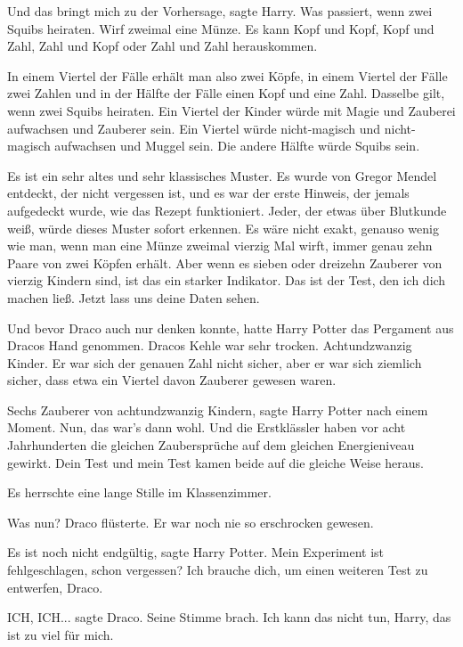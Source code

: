 \glqq Und das bringt mich zu der Vorhersage\grqq{}, sagte Harry. \glqq Was
passiert, wenn zwei Squibs heiraten. Wirf zweimal eine Münze. Es kann Kopf und
Kopf, Kopf und Zahl, Zahl und Kopf oder Zahl und Zahl herauskommen.

In einem Viertel der Fälle erhält man also zwei Köpfe, in einem Viertel der
Fälle zwei Zahlen und in der Hälfte der Fälle einen Kopf und eine Zahl. Dasselbe
gilt, wenn zwei Squibs heiraten. Ein Viertel der Kinder würde mit Magie und
Zauberei aufwachsen und Zauberer sein. Ein Viertel würde nicht-magisch und
nicht-magisch aufwachsen und Muggel sein. Die andere Hälfte würde Squibs sein.

Es ist ein sehr altes und sehr klassisches Muster. Es wurde von Gregor Mendel
entdeckt, der nicht vergessen ist, und es war der erste Hinweis, der jemals
aufgedeckt wurde, wie das Rezept funktioniert. Jeder, der etwas über Blutkunde
weiß, würde dieses Muster sofort erkennen. Es wäre nicht exakt, genauso wenig
wie man, wenn man eine Münze zweimal vierzig Mal wirft, immer genau zehn Paare
von zwei Köpfen erhält. Aber wenn es sieben oder dreizehn Zauberer von vierzig
Kindern sind, ist das ein starker Indikator. Das ist der Test, den ich dich
machen ließ. Jetzt lass uns deine Daten sehen.\grqq{}

Und bevor Draco auch nur denken konnte, hatte Harry Potter das Pergament aus
Dracos Hand genommen. Dracos Kehle war sehr trocken. Achtundzwanzig Kinder. Er
war sich der genauen Zahl nicht sicher, aber er war sich ziemlich sicher, dass
etwa ein Viertel davon Zauberer gewesen waren.

\glqq Sechs Zauberer von achtundzwanzig Kindern\grqq{}, sagte Harry Potter nach
einem Moment. \glqq Nun, das war's dann wohl. Und die Erstklässler haben vor
acht Jahrhunderten die gleichen Zaubersprüche auf dem gleichen Energieniveau
gewirkt. Dein Test und mein Test kamen beide auf die gleiche Weise
heraus.\grqq{}

Es herrschte eine lange Stille im Klassenzimmer.

\glqq Was nun?\grqq{} Draco flüsterte. Er war noch nie so erschrocken gewesen.

\glqq Es ist noch nicht endgültig\grqq{}, sagte Harry Potter. \glqq Mein
Experiment ist fehlgeschlagen, schon vergessen? Ich brauche dich, um einen
weiteren Test zu entwerfen, Draco.\grqq{}

\glqq ICH, ICH...\grqq{} sagte Draco. Seine Stimme brach. \glqq Ich kann das
nicht tun, Harry, das ist zu viel für mich.\grqq{}

